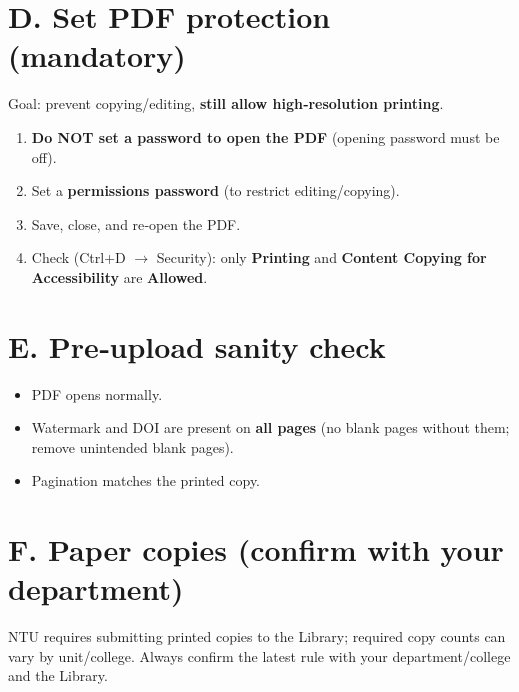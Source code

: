 \documentclass[12pt,a4paper]{article}
\begin{document}
\section*{D. Set PDF protection (mandatory)}
Goal: prevent copying/editing, \textbf{still allow high‑resolution printing}.
\begin{enumerate}
  \item \textbf{Do NOT set a password to open the PDF} (opening password must be off).
  \item Set a \textbf{permissions password} (to restrict editing/copying).
  \item Save, close, and re‑open the PDF.
  \item Check (Ctrl+D \(\rightarrow\) Security): only
        \textbf{Printing} and \textbf{Content Copying for Accessibility} are \textbf{Allowed}.
\end{enumerate}

\section*{E. Pre‑upload sanity check}
\begin{itemize}
  \item PDF opens normally.
  \item Watermark and DOI are present on \textbf{all pages} (no blank pages without them; remove unintended blank pages).
  \item Pagination matches the printed copy.
\end{itemize}

\section*{F. Paper copies (confirm with your department)}
NTU requires submitting printed copies to the Library; required copy counts can vary by unit/college.
Always confirm the latest rule with your department/college and the Library.
\end{document}
